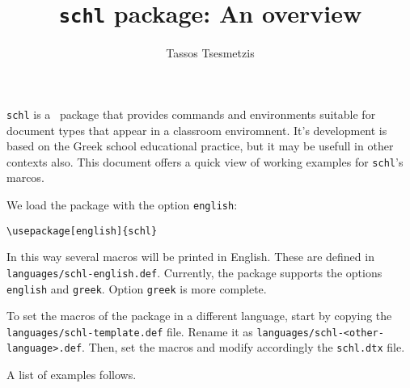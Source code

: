 \documentclass[12pt,a4page]{article}
\author{Tassos Tsesmetzis}
\title{\texttt{schl} package: An overview}
\date{}
\begin{document}
\maketitle

\verb|schl| is a \XeLaTeX\, package that provides commands and environments suitable for document types that appear in a classroom enviromnent. It's development is based on the Greek school educational practice, but it may be usefull in other contexts also. This document offers a quick view of working examples for \verb|schl|'s marcos. 

We load the package with the option \verb|english|:

\begin{center}
\verb|\usepackage[english]{schl}|
\end{center}

In this way several macros will be printed in English. These are
defined in \verb|languages/schl-english.def|. Currently, the package
supports the options \verb|english| and \verb|greek|. Option \verb|greek| is more complete.

To set the macros of the package in a different language, start by copying the \verb|languages/schl-template.def| file. Rename it as \verb|languages/schl-<other-language>.def|. Then, set the macros and modify accordingly the \verb|schl.dtx| file.

A list of examples follows. 
\end{document}
